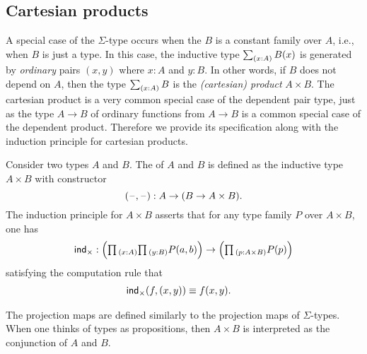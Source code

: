 \subsection{Cartesian products}

A special case of the $\Sigma$-type occurs when the $B$ is a constant family over $A$, i.e., when $B$ is just a type.
In this case, the inductive type $\sm{x:A}B(x)$ is generated by \emph{ordinary} pairs $(x,y)$ where $x:A$ and $y:B$. In other words, if $B$ does not depend on $A$, then the type $\sm{x:A}B$ is the \emph{(cartesian) product} $A\times B$.
The cartesian product is a very common special case of the dependent pair type, just as the type $A\to B$ of ordinary functions from $A\to B$ is a common special case of the dependent product. Therefore we provide its specification along with the induction principle for cartesian products.

\begin{defn}
Consider two types $A$ and $B$. The  of $A$ and $B$ is defined as the inductive type $A\times B$ with constructor
\begin{equation*}
(\mathord{\hspace{1pt}\text{--}\hspace{1pt}},\mathord{\hspace{1pt}\text{--}\hspace{1pt}}):A\to (B\to A\times B).
\end{equation*}
The induction principle for $A\times B$ asserts that for any type family $P$ over $A\times B$, one has
\begin{equation*}
\ind{\times} : \Big(\prd{x:A}{y:B}P(a,b)\Big)\to\Big(\prd{p:A\times B} P(p)\Big)
\end{equation*}
satisfying the computation rule that
\begin{align*}
\mathsf{ind}_{\times}(f,(x,y)) & \equiv f(x,y).
\end{align*}
\end{defn}

The projection maps are defined similarly to the projection maps of $\Sigma$-types. When one thinks of types as propositions, then $A\times B$ is interpreted as the conjunction of $A$ and $B$.

